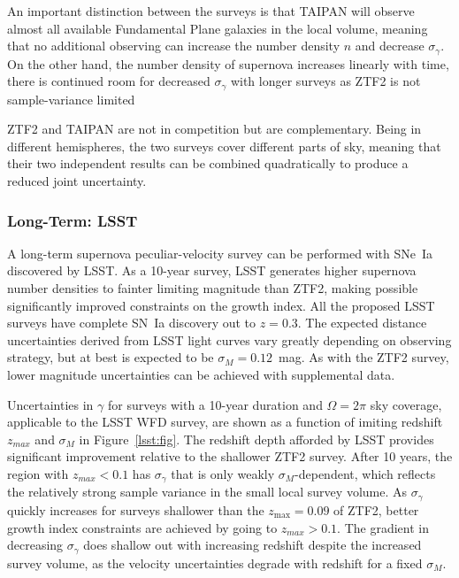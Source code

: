 \documentclass[11pt, oneside]{article}   	%
\begin{document}
An important distinction between the surveys is
that TAIPAN will observe almost all available Fundamental Plane galaxies in the local volume, meaning that no additional observing can
increase the number density $n$ and decrease $\sigma_\gamma$.  On the other hand, the number density of supernova increases
linearly with time, there is continued room for decreased $\sigma_\gamma$ with longer surveys  as ZTF2 is not  sample-variance limited 


ZTF2 and TAIPAN are not in competition but are complementary.  Being in different hemispheres, the two surveys
cover different parts of sky, meaning that their two independent results can be
combined  quadratically to produce a reduced joint uncertainty. 

\subsubsection{Long-Term: LSST}
A long-term supernova peculiar-velocity survey can be performed with SNe~Ia discovered by LSST.
As a 10-year survey, LSST generates higher supernova number densities to fainter limiting magnitude than  ZTF2,
making possible significantly improved constraints on the growth index.
All the proposed LSST surveys have complete SN~Ia discovery out to $z=0.3$.
The expected distance uncertainties derived from LSST light curves vary greatly depending on observing strategy, but at best
is expected to be $\sigma_M=0.12$~mag.    As with the ZTF2 survey,  lower magnitude uncertainties
can be achieved with supplemental data.

Uncertainties in $\gamma$ for surveys with a 10-year duration   and $\Omega=2\pi$ sky coverage, applicable to the LSST WFD survey, 
are shown as a function of imiting  redshift $z_{max}$ and $\sigma_M$ in Figure~\ref{lsst:fig}.
The redshift depth afforded by LSST provides significant improvement relative to the shallower ZTF2 survey.
After 10 years, the region with $z_{max}<0.1$ has $\sigma_\gamma$ that is only weakly $\sigma_M$-dependent, 
which reflects the relatively strong sample variance in the small local survey volume.  
As $\sigma_\gamma$ quickly increases for surveys shallower than the $z_{\text{max}}=0.09$ 
of ZTF2,
better growth index constraints
are achieved by going to $z_{max}>0.1$.
The gradient in decreasing $\sigma_\gamma$ does shallow out with increasing redshift despite the increased survey volume, 
as the velocity uncertainties degrade with redshift for a fixed $\sigma_M$.
\end{document}
